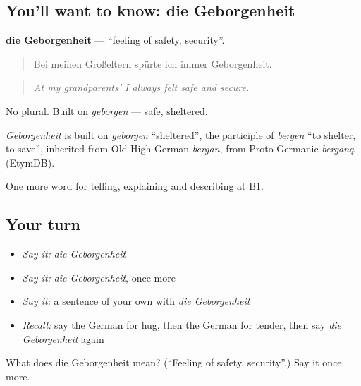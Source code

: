 \subsection*{You'll want to know: die Geborgenheit}
\textbf{die Geborgenheit} — \textquotedblleft{}feeling of safety, security\textquotedblright{}.

\begin{quote}
Bei meinen Großeltern spürte ich immer Geborgenheit.
\end{quote}

\begin{quote}
\emph{At my grandparents' I always felt safe and secure.}
\end{quote}

No plural. Built on \emph{geborgen} — safe, sheltered.

\begin{cousinweb}
\emph{Geborgenheit} is built on \emph{geborgen} \textquotedblleft{}sheltered\textquotedblright{}, the participle of \emph{bergen} \textquotedblleft{}to shelter, to save\textquotedblright{}, inherited from Old High German \emph{bergan}, from Proto-Germanic \emph{berganą} (EtymDB).
\end{cousinweb}

\begin{grammarlens}[title={What you've built}]
One more word for telling, explaining and describing at B1.
\end{grammarlens}

\subsection*{Your turn}
\begin{itemize}
\raggedright
  \item \emph{Say it:} \emph{die Geborgenheit}
  \item \emph{Say it:} \emph{die Geborgenheit}, once more
  \item \emph{Say it:} a sentence of your own with \emph{die Geborgenheit}
  \item \emph{Recall:} say the German for hug, then the German for tender, then say \emph{die Geborgenheit} again
\end{itemize}

\begin{tcolorbox}[breakable,colback=teal!4,colframe=teal!35!black,title={Before you move on}]
What does die Geborgenheit mean? (\textquotedblleft{}Feeling of safety, security\textquotedblright{}.) Say it once more.
\end{tcolorbox}
